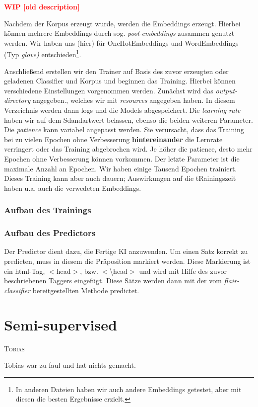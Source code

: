 \documentclass[10pt,a4paper]{article}
\newcommand{\chapterauthor}[1]{%
	{\parindent0pt\vspace*{-5pt}\hspace*{\fill}%
  \linespread{1.1}\large\scshape#1%
  \par\nobreak\vspace*{10pt}}
}
\begin{document}
\textbf{\textcolor{red}{WIP [old description]}}

Nachdem der Korpus erzeugt wurde, werden die Embeddings erzeugt. Hierbei können mehrere Embeddings durch sog. \textit{pool-embeddings} zusammen genutzt werden. Wir haben uns (hier) für OneHotEmbeddings und WordEmbeddings (Typ \textit{glove)} entschieden\footnote{In anderen Dateien haben wir auch andere Embeddings getestet, aber mit diesen die besten Ergebnisse erzielt.}.

Anschließend erstellen wir den Trainer auf Basis des zuvor erzeugten oder geladenen Classifier und Korpus und beginnen das Training. Hierbei können verschiedene Einstellungen vorgenommen werden. Zunächst wird das \textit{output-directory} angegeben., welches wir mit \textit{resources} angegeben haben. In diesem Verzeichnis werden dann logs und die Models abgespeichert. Die \textit{learning rate} haben wir auf dem Sdandartwert belassen, ebenso die beiden weiteren Parameter. Die \textit{patience} kann variabel angepasst werden. Sie verursacht, dass das Training bei zu vielen Epochen ohne Verbesserung \textbf{hintereinander} die Lernrate verringert oder das Training abgebrochen wird. Je höher die patience, desto mehr Epochen ohne Verbesserung können vorkommen. Der letzte Parameter ist die maximale Anzahl an Epochen. Wir haben einige Tausend Epochen trainiert. Dieses Training kann aber auch dauern; Auswirkungen auf die tRainingszeit haben u.a. auch die verwedeten Embeddings.

\subsubsection{Aufbau des Trainings}


\subsubsection{Aufbau des Predictors}
Der Predictor dient dazu, die Fertige KI anzuwenden. Um einen Satz korrekt zu predicten, muss in diesem die Präposition markiert werden. Diese Markierung ist ein html-Tag, $<$head$>$, bzw. $<$\textbackslash head$>$ und wird mit Hilfe des zuvor beschriebenen Taggers eingefügt. Diese Sätze werden dann mit der vom \textit{flair-classifier} bereitgestellten Methode predictet.

\newpage

\newpage

\section{Semi-supervised}
\chapterauthor{Tobias}
Tobias war zu faul und hat nichts gemacht.
\end{document}

